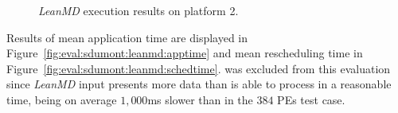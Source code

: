 \begin{figure}[!ht]
 \centering
 \caption{\textit{LeanMD} execution results on platform 2.}
 \label{fig:eval:sdumont:leanmd}
\end{figure}



Results of mean application time are displayed in Figure~\ref{fig:eval:sdumont:leanmd:apptime} and mean rescheduling time in Figure~\ref{fig:eval:sdumont:leanmd:schedtime}.
 was excluded from this evaluation since \textit{LeanMD} input presents more data than  is able to process in a reasonable time, being on average $1,000$ms slower than \greedylb in the $384$ PEs test case. %

